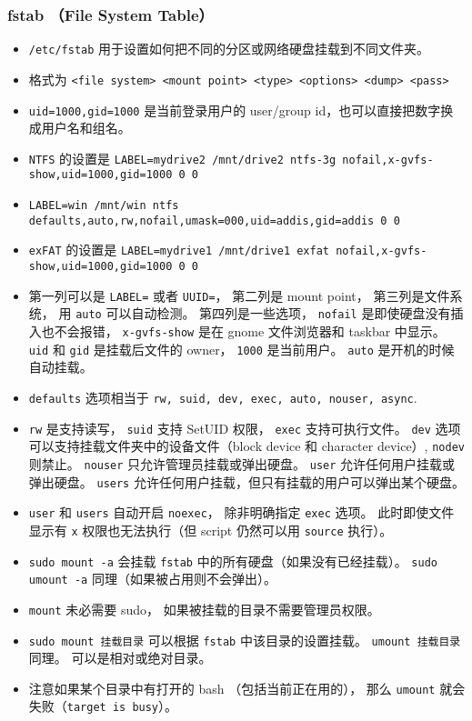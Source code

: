 \subsubsection{fstab （File System Table）}
\begin{itemize}
\item \verb|/etc/fstab| 用于设置如何把不同的分区或网络硬盘挂载到不同文件夹。
\item 格式为 \verb|<file system> <mount point> <type> <options> <dump> <pass>|
\item \verb|uid=1000,gid=1000| 是当前登录用户的 user/group id，也可以直接把数字换成用户名和组名。
\item \verb|NTFS| 的设置是 \verb|LABEL=mydrive2 /mnt/drive2 ntfs-3g nofail,x-gvfs-show,uid=1000,gid=1000 0 0|
\item \verb|LABEL=win /mnt/win ntfs defaults,auto,rw,nofail,umask=000,uid=addis,gid=addis 0 0|
\item \verb|exFAT| 的设置是 \verb|LABEL=mydrive1 /mnt/drive1 exfat nofail,x-gvfs-show,uid=1000,gid=1000 0 0|
\item 第一列可以是 \verb|LABEL=| 或者 \verb|UUID=|， 第二列是 mount point， 第三列是文件系统， 用 \verb|auto| 可以自动检测。 第四列是一些选项， \verb|nofail| 是即使硬盘没有插入也不会报错， \verb|x-gvfs-show| 是在 gnome 文件浏览器和 taskbar 中显示。 \verb|uid| 和 \verb|gid| 是挂载后文件的 owner， \verb|1000| 是当前用户。 \verb|auto| 是开机的时候自动挂载。
\item \verb|defaults| 选项相当于 \verb|rw, suid, dev, exec, auto, nouser, async|.
\item \verb|rw| 是支持读写， \verb|suid| 支持 SetUID 权限， \verb|exec| 支持可执行文件。 \verb|dev| 选项可以支持挂载文件夹中的设备文件（block device 和 character device）, \verb|nodev| 则禁止。 \verb|nouser| 只允许管理员挂载或弹出硬盘。 \verb|user| 允许任何用户挂载或弹出硬盘。 \verb|users| 允许任何用户挂载，但只有挂载的用户可以弹出某个硬盘。
\item \verb|user| 和 \verb|users| 自动开启 \verb|noexec|， 除非明确指定 \verb|exec| 选项。 此时即使文件显示有 \verb|x| 权限也无法执行（但 script 仍然可以用 \verb|source| 执行）。
\item \verb|sudo mount -a| 会挂载 \verb|fstab| 中的所有硬盘（如果没有已经挂载）。 \verb|sudo umount -a| 同理（如果被占用则不会弹出）。
\item \verb|mount| 未必需要 sudo， 如果被挂载的目录不需要管理员权限。
\item \verb|sudo mount 挂载目录| 可以根据 \verb|fstab| 中该目录的设置挂载。 \verb|umount 挂载目录| 同理。 可以是相对或绝对目录。
\item 注意如果某个目录中有打开的 bash （包括当前正在用的）， 那么 \verb|umount| 就会失败（\verb|target is busy|）。
\end{itemize}

